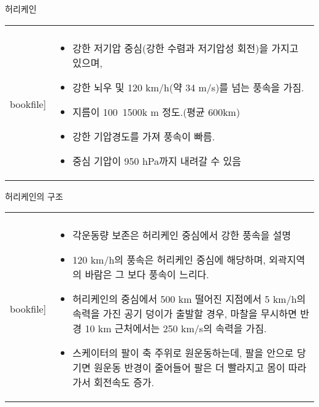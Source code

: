 \begin{frame}[t]{허리케인}
	\begin{tabular}{ll}
		\begin{minipage}[t]{0.5\textwidth}\scriptsize
			\begin{figure}[t]
				\texttt{[image: \\bookfile]}
			\end{figure}
		\end{minipage}	
		&
		\begin{minipage}[t]{0.45\textwidth} \scriptsize	

			\begin{itemize}
				\item 강한 저기압 중심(강한 수렴과 저기압성 회전)을 가지고 있으며, 
				\item 강한 뇌우 및 120 km/h(약 34 m/s)를 넘는 풍속을 가짐.
				\item 지름이 100~1500k m 정도.(평균 600km)
				\item 강한 기압경도를 가져 풍속이 빠름.
				\item 중심 기압이 950 hPa까지 내려갈 수 있음
			\end{itemize}

		\end{minipage}
	\end{tabular}
\end{frame}
\begin{frame}[t]{허리케인의 구조}
	\begin{tabular}{ll}
		\begin{minipage}[t]{0.3\textwidth}\scriptsize
			\begin{figure}[t]
				\texttt{[image: \\bookfile]}
			\end{figure}
		\end{minipage}	
		&
		\begin{minipage}[t]{0.65\textwidth} \scriptsize	
			
			\begin{itemize}
				\item 각운동량 보존은 허리케인 중심에서 강한 풍속을 설명
				\item 120 km/h의 풍속은 허리케인 중심에 해당하며, 외곽지역의 바람은 그 보다 풍속이 느리다. 
				\item 허리케인의 중심에서 500 km 떨어진 지점에서 5 km/h의 속력을 가진 공기 덩이가 출발할 경우, 마찰을 무시하면 반경 10 km 근처에서는 250 km/s의 속력을 가짐.
				\item 스케이터의 팔이 축 주위로 원운동하는데, 팔을 안으로 당기면 원운동 반경이 줄어들어 팔은 더 빨라지고 몸이 따라가서 회전속도 증가.
			\end{itemize}

		\end{minipage}
	\end{tabular}
\end{frame}

